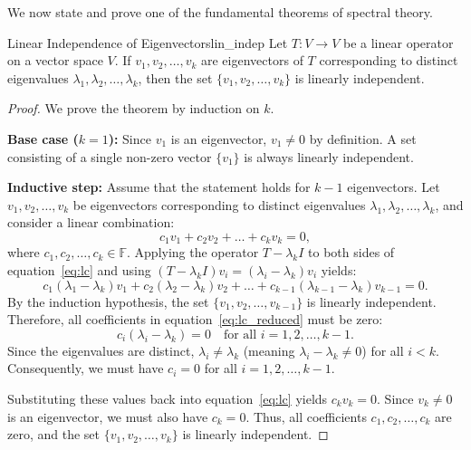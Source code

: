 We now state and prove one of the fundamental theorems of spectral theory.

\begin{theorem}{Linear Independence of Eigenvectors}{lin_indep}
    Let $T: V \to V$ be a linear operator on a vector space $V$. If $v_1, v_2, \dots, v_k$ are eigenvectors of $T$ corresponding to distinct eigenvalues $\lambda_1, \lambda_2, \dots, \lambda_k$, then the set $\{v_1, v_2, \dots, v_k\}$ is linearly independent.
\end{theorem}

\begin{proof}
    We prove the theorem by induction on $k$.
    
    \textbf{Base case ($k=1$):} Since $v_1$ is an eigenvector, $v_1 \neq 0$ by definition. A set consisting of a single non-zero vector $\{v_1\}$ is always linearly independent.
    
    \textbf{Inductive step:} Assume that the statement holds for $k - 1$ eigenvectors. Let $v_1, v_2, \dots, v_k$ be eigenvectors corresponding to distinct eigenvalues $\lambda_1, \lambda_2, \dots, \lambda_k$, and consider a linear combination:
    \begin{equation}\label{eq:lc}
        c_1 v_1 + c_2 v_2 + \dots + c_k v_k = 0,
    \end{equation}
    where $c_1, c_2, \dots, c_k \in \mathbb{F}$. Applying the operator $T - \lambda_k I$ to both sides of equation~\eqref{eq:lc} and using $(T - \lambda_k I)v_i = (\lambda_i - \lambda_k)v_i$ yields:
    \begin{equation}\label{eq:lc_reduced}
        c_1 (\lambda_1 - \lambda_k) v_1 + c_2 (\lambda_2 - \lambda_k) v_2 + \dots + c_{k-1} (\lambda_{k-1} - \lambda_k) v_{k-1} = 0.
    \end{equation}
    By the induction hypothesis, the set $\{v_1, v_2, \dots, v_{k-1}\}$ is linearly independent. Therefore, all coefficients in equation~\eqref{eq:lc_reduced} must be zero:
    \begin{equation*}
        c_i (\lambda_i - \lambda_k) = 0 \quad \text{for all } i = 1, 2, \dots, k-1.
    \end{equation*}
    Since the eigenvalues are distinct, $\lambda_i \neq \lambda_k$ (meaning $\lambda_i - \lambda_k \neq 0$) for all $i < k$. Consequently, we must have $c_i = 0$ for all $i = 1, 2, \dots, k-1$.
    
    Substituting these values back into equation~\eqref{eq:lc} yields $c_k v_k = 0$. Since $v_k \neq 0$ is an eigenvector, we must also have $c_k = 0$. Thus, all coefficients $c_1, c_2, \dots, c_k$ are zero, and the set $\{v_1, v_2, \dots, v_k\}$ is linearly independent.
\end{proof}
